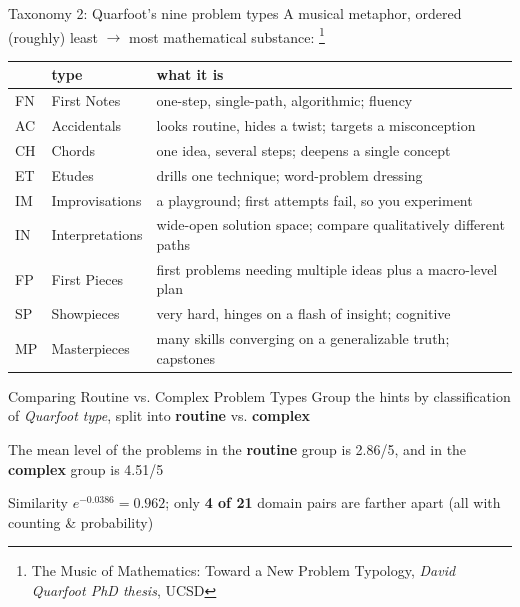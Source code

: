 \documentclass[10pt,aspectratio=169]{beamer}
\begin{document}
\begin{frame}{Taxonomy 2: Quarfoot's nine problem types}
  A musical metaphor, ordered (roughly) least $\to$ most mathematical substance: \footnote{The Music of Mathematics: Toward a New Problem Typology, \textit{David Quarfoot PhD thesis}, UCSD}  
  \medskip
  \begin{center}
    \small
    \begin{tabular}{llp{}}
      \toprule
      & type & what it is \\
      \midrule
      FN & First Notes & one-step, single-path, algorithmic; fluency \\  
      AC & Accidentals & looks routine, hides a twist; targets a misconception \\  
      CH & Chords & one idea, several steps; deepens a single concept \\  
      ET & Etudes & drills one technique; word-problem dressing \\  
      IM & Improvisations & a playground; first attempts fail, so you experiment \\  
      IN & Interpretations & wide-open solution space; compare qualitatively different paths \\  
      FP & First Pieces & first problems needing multiple ideas plus a macro-level plan \\  
      SP & Showpieces & very hard, hinges on a flash of insight; cognitive \\  
      MP & Masterpieces & many skills converging on a generalizable truth; capstones \\
      \bottomrule
    \end{tabular}
  \end{center}
\end{frame}

\begin{frame}{Comparing Routine vs. Complex Problem Types}
  Group the hints by classification of \emph{Quarfoot type}, split into \textbf{routine} vs. \textbf{complex}  

  \bigskip 

  The mean level of the problems in the \textbf{routine} group is 2.86/5, and in the \textbf{complex} group is 4.51/5

  \bigskip  
  Similarity $e^{-0.0386} = \mathbf{0.962}$; only \textbf{4 of 21} domain pairs
  are farther apart (all with counting \& probability)
\end{frame}
\end{document}
